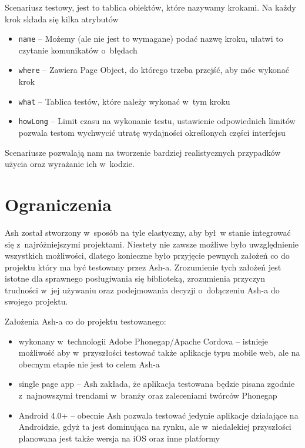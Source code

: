 \documentclass{xmgr}
\begin{document}
Scenariusz testowy, jest to tablica obiektów, które nazywamy krokami. Na każdy krok składa się kilka atrybutów

  \begin{itemize}
    \item \texttt{name} -- Możemy (ale nie jest to wymagane) podać nazwę kroku, ułatwi to czytanie komunikatów o~błędach
    \item \texttt{where} -- Zawiera Page Object, do którego trzeba przejść, aby móc wykonać krok 
    \item \texttt{what} -- Tablica testów, które należy wykonać w~tym kroku
    \item \texttt{howLong} -- Limit czasu na wykonanie testu, ustawienie odpowiednich limitów pozwala testom wychwycić utratę wydajności określonych części interfejsu
  \end{itemize}

Scenariusze pozwalają nam na tworzenie bardziej realistycznych przypadków użycia oraz wyrażanie ich w~kodzie. 

\section{Ograniczenia}

Ash został stworzony w~sposób na tyle elastyczny, aby był~w stanie integrować się z~najróżniejszymi projektami. Niestety nie zawsze możliwe było uwzględnienie wszystkich możliwości, dlatego konieczne było przyjęcie pewnych założeń co do projektu który ma być testowany przez Ash-a. Zrozumienie tych założeń jest istotne dla sprawnego posługiwania się biblioteką, zrozumienia przyczyn trudności w~jej używaniu oraz podejmowania decyzji o~dołączeniu Ash-a do swojego projektu.

Założenia Ash-a co do projektu testowanego:

\begin{itemize}
  \item wykonany w~technologii Adobe Phonegap/Apache Cordova -- istnieje możliwość aby w~przyszłości testować także aplikacje typu mobile web, ale na obecnym etapie nie jest to celem Ash-a
  \item single page app -- Ash zakłada, że aplikacja testowana będzie pisana zgodnie z~najnowszymi trendami w~branży oraz zaleceniami twórców Phonegap
  \item Android 4.0+ -- obecnie Ash pozwala testować jedynie aplikacje działające na Androidzie, gdyż ta jest dominująca na rynku, ale w~niedalekiej przyszłości planowana jest także wersja na iOS oraz inne platformy
\end{itemize}
\end{document}
